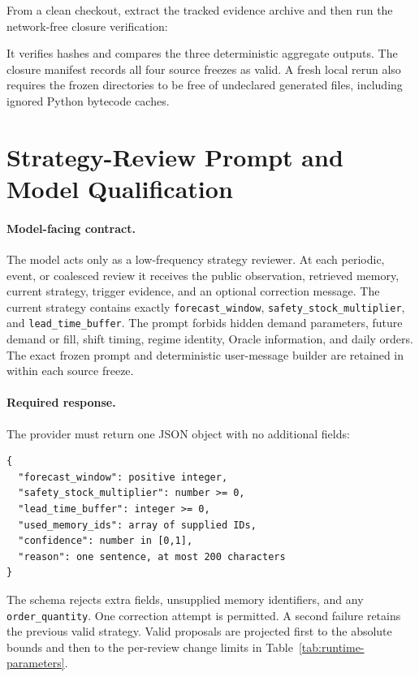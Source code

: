 From a clean checkout, extract the tracked evidence archive and then run the
network-free closure verification:
\begin{quote}
\small\ttfamily
{}\par
{}\par
{}
\end{quote}
It verifies hashes and compares the three deterministic aggregate outputs. The
closure manifest records all four source freezes as valid. A fresh local rerun
also requires the frozen directories to be free of undeclared generated files,
including ignored Python bytecode caches.

\section{Strategy-Review Prompt and Model Qualification}
\label{app:prompt}

\paragraph{Model-facing contract.}
The model acts only as a low-frequency strategy reviewer. At each periodic,
event, or coalesced review it receives the public observation, retrieved memory,
current strategy, trigger evidence, and an optional correction message. The
current strategy contains exactly \texttt{forecast\_window},
\texttt{safety\_stock\_multiplier}, and \texttt{lead\_time\_buffer}. The prompt
forbids hidden demand parameters, future demand or fill, shift timing, regime
identity, Oracle information, and daily orders. The exact frozen prompt and
deterministic user-message builder are retained in
 within each source freeze.

\paragraph{Required response.}
The provider must return one JSON object with no additional fields:
\begin{verbatim}
{
  "forecast_window": positive integer,
  "safety_stock_multiplier": number >= 0,
  "lead_time_buffer": integer >= 0,
  "used_memory_ids": array of supplied IDs,
  "confidence": number in [0,1],
  "reason": one sentence, at most 200 characters
}
\end{verbatim}
The schema rejects extra fields, unsupplied memory identifiers, and any
\texttt{order\_quantity}. One correction attempt is permitted. A second failure
retains the previous valid strategy. Valid proposals are projected first to the
absolute bounds and then to the per-review change limits in
Table~\ref{tab:runtime-parameters}.

